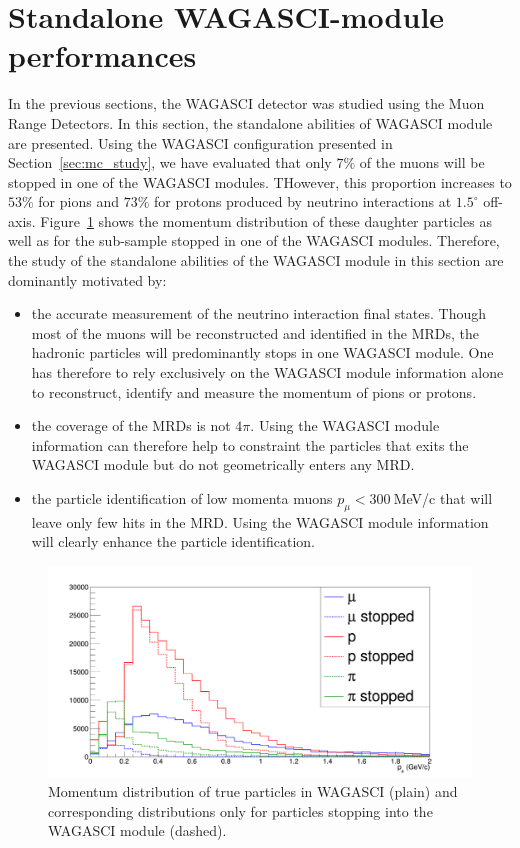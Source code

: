 \section{Standalone WAGASCI-module performances}
\label{sec:mc_study_standalone}

In the previous sections, the WAGASCI detector was studied using the Muon Range Detectors. In this section, the standalone abilities of WAGASCI module are presented. Using the WAGASCI configuration presented in Section~\ref{sec:mc_study}, we have evaluated that only $7\%$ of the muons will be stopped in one of the WAGASCI modules. THowever, this proportion increases to $53\%$ for pions and $73\%$ for protons produced by neutrino interactions at $1.5^{\circ}$ off-axis. Figure~\ref{fig:stoppedproportions} shows the momentum distribution of these daughter particles as well as for the sub-sample stopped in one of the WAGASCI modules. Therefore, the study of the standalone abilities of the WAGASCI module in this section are dominantly motivated by:
\begin{itemize}
\item the accurate measurement of the neutrino interaction final states. Though most of the muons will be reconstructed and identified in the MRDs, the hadronic particles will predominantly stops in one WAGASCI module. One has therefore to rely exclusively on the WAGASCI module information alone to reconstruct, identify and measure the momentum of pions or protons.
\item the coverage of the MRDs is not $4\pi$. Using the WAGASCI module information can therefore help to constraint the particles that exits the WAGASCI module but do not geometrically enters any MRD.
\item the particle identification of low momenta muons $p_{\mu} < 300~$MeV/c that will leave only few hits in the MRD. Using the WAGASCI module information will clearly enhance the particle identification.
\end{itemize}

\begin{figure}
  \centering
\includegraphics[width=.7\textwidth]{fig/StoppedProportionsMomentum.pdf}
\caption{\label{fig:stoppedproportions} Momentum distribution of true particles in WAGASCI (plain) and corresponding distributions only for particles stopping into the WAGASCI module (dashed).}
\end{figure}

